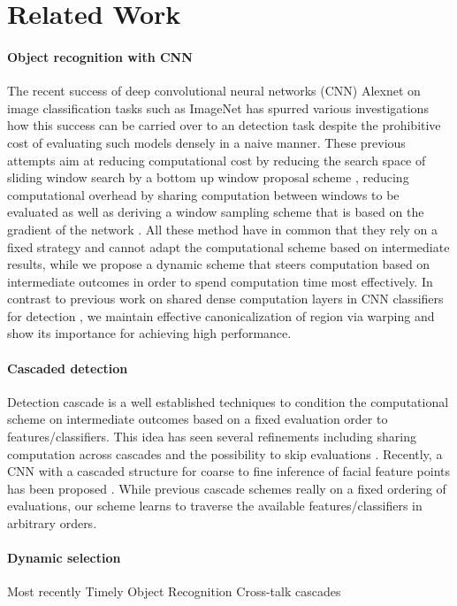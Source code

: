 \section{Related Work}\label{sec:related}

\paragraph{Object recognition with CNN}\label{object-recognition-with-cnn}
The recent success of deep convolutional neural networks (CNN) Alexnet \cite{Krizhevsky-NIPS-2012} on image classification tasks such as ImageNet \cite{deng2009cvpr} has spurred various investigations \cite{Girshick-CVPR-2014,Zou-CVPR-2014,Simonyan-ICLR-2014,Sermanet-ICLR-2014} how this success can be carried over to an detection task despite the prohibitive cost of evaluating such models densely in a naive manner. These previous attempts aim at reducing computational cost by reducing the search space of sliding window search by a bottom up window proposal scheme \cite{Girshick-CVPR-2014}, reducing computational overhead by sharing computation between windows to be evaluated \cite{Zou-CVPR-2014,Sermanet-ICLR-2014} as well as deriving a window sampling scheme that is based on the gradient of the network \cite{Simonyan-ICLR-2014}. All these method have in common that they rely on a fixed strategy and cannot adapt the computational scheme based on intermediate results, while we propose a dynamic scheme that steers computation based on intermediate outcomes in order to spend computation time most effectively. In contrast to previous work on shared dense computation layers in CNN classifiers for detection \cite{Zou-CVPR-2014,Sermanet-ICLR-2014}, we maintain effective canonicalization of region via warping and show its importance for achieving high performance.

\paragraph{Cascaded detection}\label{cascaded-detection}
Detection cascade \cite{Viola2004,Felzenszwalb-CVPR-2010} is a well established techniques to condition the computational scheme on intermediate outcomes based on a fixed evaluation order to features/classifiers. This idea has seen several refinements including sharing computation across cascades \cite{Dollar-ECCV-2012} and the possibility to skip evaluations \cite{benbouzid12icml}. Recently, a CNN with a cascaded structure for coarse to fine inference of facial feature points has been proposed \cite{cnn_cascade}. While previous cascade schemes really on a fixed ordering of evaluations, our scheme learns to traverse the available features/classifiers in arbitrary orders.

\paragraph{Dynamic selection}\label{dynamic-selection}
Most recently
  Timely Object Recognition \cite{Karayev-NIPS-2012}
  Cross-talk cascades \cite{Dollar-ECCV-2012}

